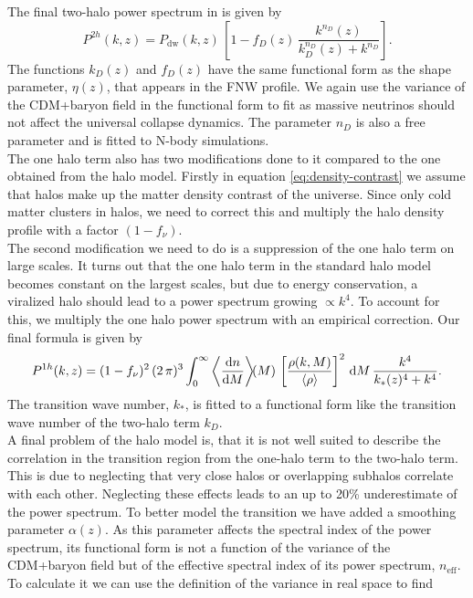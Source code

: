 \documentclass[../main.tex]{subfiles}
\begin{document}
The final two-halo power spectrum in \hmcode is given by \begin{equation}
    P^{2h}(k,z) = P_\mathrm{dw}(k,z)\,\left[1-f_D(z)\,\frac{k^{n_D}(z)}{k_D^{n_D}(z)+k^{n_D}}\right].
\end{equation}
The functions $k_D(z)$ and $f_D(z)$ have the same functional form as the shape parameter, $\eta(z)$, that appears in the FNW profile. We again use the variance of the CDM+baryon field in the functional form to fit as massive neutrinos should not affect the universal collapse dynamics. The parameter $n_D$ is also a free parameter and is fitted to N-body simulations.\\
The one halo term also has two modifications done to it compared to the one obtained from the halo model. Firstly in equation \ref{eq:density-contrast} we assume that halos make up the matter density contrast of the universe. Since only cold matter clusters in halos, we need to correct this and multiply the halo density profile with a factor $(1-f_\nu)$.\\
The second modification we need to do is a suppression of the one halo term on large scales. It turns out that the one halo term in the standard halo model becomes constant on the largest scales, but due to energy conservation, a viralized halo should lead to a power spectrum growing $\propto k^4$. To account for this, we multiply the one halo power spectrum with an empirical correction. Our final formula is given by
\begin{equation}
    P^{1h}(k,z) = (1-f_\nu)^2\,(2\,\pi)^3\int_0^\infty \left\langle\frac{\mathrm{d} n}{\mathrm{d} M}\right\rangle\!\!(M)\,\left[\frac{\rho(k,M)}{\langle \rho \rangle}\right]^2 \,\mathrm{d} M\,\frac{k^4}{k_*(z)^4+k^4}.
\end{equation}
The transition wave number, $k_*$, is fitted to a functional form like the transition wave number of the two-halo term $k_D$.\\
A final problem of the halo model is, that it is not well suited to describe the correlation in the transition region from the one-halo term to the two-halo term. This is due to neglecting that very close halos or overlapping subhalos correlate with each other. Neglecting these effects leads to an up to 20\% underestimate of the power spectrum. To better model the transition we have added a smoothing parameter $\alpha(z)$. As this parameter affects the spectral index of the power spectrum, its functional form is not a function of the variance of the CDM+baryon field but of the effective spectral index of its power spectrum, $n_\mathrm{eff}$. To calculate it we can use the definition of the variance in real space to find 
\end{document}
